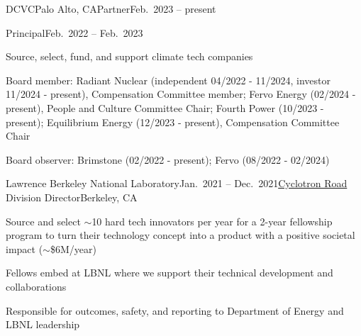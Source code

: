 \begin{rSubsection}{DCVC}{Palo Alto, CA}{Partner}{Feb.\ 2023 -- present}
\end{rSubsection}
\vspace*{-2 em}
\begin{rSubsection}{}{}{Principal}{Feb.\ 2022 -- Feb.\ 2023}
\item Source, select, fund, and support climate tech companies
\item Board member: Radiant Nuclear (independent 04/2022 - 11/2024, investor 11/2024 - present), Compensation Committee member; Fervo Energy (02/2024 - present), People and Culture Committee Chair; Fourth Power (10/2023 - present); Equilibrium Energy (12/2023 - present), Compensation Committee Chair
\item Board observer: Brimstone (02/2022 - present); Fervo (08/2022 - 02/2024)
\end{rSubsection}


\begin{rSubsection}{Lawrence Berkeley National Laboratory}{Jan.\ 2021 -- Dec.\ 2021}{\href{https://cyclotronroad.lbl.gov/}{Cyclotron Road} Division Director}{Berkeley, CA}
\item Source and select $\sim$10 hard tech innovators per year for a 2-year fellowship program to turn their technology concept into a product with a positive societal impact ($\sim$\$6M/year) 
\item Fellows embed at LBNL where we support their technical development and collaborations
\item Responsible for outcomes, safety, and reporting to Department of Energy and LBNL leadership
\end{rSubsection}


